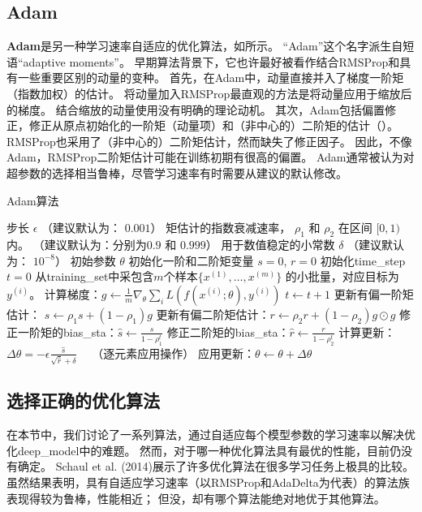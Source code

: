 \subsection{Adam}
\label{sec:adam}
\textbf{Adam}是另一种学习速率自适应的优化算法，如所示。
``Adam''这个名字派生自短语``adaptive moments''。
早期算法背景下，它也许最好被看作结合RMSProp和具有一些重要区别的动量的变种。
首先，在Adam中，动量直接并入了梯度一阶矩（指数加权）的估计。
将动量加入RMSProp最直观的方法是将动量应用于缩放后的梯度。
结合缩放的动量使用没有明确的理论动机。
其次，Adam包括偏置修正，修正从原点初始化的一阶矩（动量项）和（非中心的）二阶矩的估计（）。
RMSProp也采用了（非中心的）二阶矩估计，然而缺失了修正因子。
因此，不像Adam，RMSProp二阶矩估计可能在训练初期有很高的偏置。
Adam通常被认为对超参数的选择相当鲁棒，尽管学习速率有时需要从建议的默认修改。\par
\begin{algorithm}[ht]
	\caption{Adam算法}
	\label{alg:adam}
	\begin{algorithmic}
		\REQUIRE 步长 $\epsilon$ （建议默认为： $0.001$）
		\REQUIRE 矩估计的指数衰减速率， $\rho_1$ 和 $\rho_2$ 在区间 $[0, 1)$内。
		（建议默认为：分别为$0.9$ 和 $0.999$）
		\REQUIRE 用于数值稳定的小常数 $\delta$  （建议默认为： $10^{-8}$）
		\REQUIRE 初始参数 $\theta$
		\STATE 初始化一阶和二阶矩变量 $s = 0 $, $r = 0$
		\STATE 初始化\gls{time_step} $t=0$ 
		\STATE 从\gls{training_set}中采包含$m$个样本$\{ x^{(1)},\dots, x^{(m)}\}$ 的小批量，对应目标为$y^{(i)}$。
		\STATE 计算梯度：$g \leftarrow \frac{1}{m} \nabla_{\theta} \sum_i L(f(x^{(i)};\theta),y^{(i)})$ 
		\STATE $t \leftarrow t + 1$
		\STATE 更新有偏一阶矩估计： $s \leftarrow \rho_1 s + (1-\rho_1) g$
		\STATE 更新有偏二阶矩估计：$r \leftarrow \rho_2 r + (1-\rho_2)  g \odot g$
		\STATE 修正一阶矩的\gls{bias_sta}：$\hat{s} \leftarrow \frac{s}{1-\rho_1^t}$
		\STATE 修正二阶矩的\gls{bias_sta}：$\hat{r} \leftarrow \frac{r}{1-\rho_2^t}$
		\STATE 计算更新：$\Delta \theta = - \epsilon \frac{\hat{s}}{\sqrt{\hat{r}} + \delta}$ \ \  （逐元素应用操作）
		\STATE 应用更新：$\theta \leftarrow \theta + \Delta \theta$
		\ENDWHILE
	\end{algorithmic}
\end{algorithm}
\subsection{选择正确的优化算法}
\label{sec:choosing_the_right_optimization_algorithms}
在本节中，我们讨论了一系列算法，通过自适应每个模型参数的学习速率以解决优化\gls{deep_model}中的难题。
然而，对于哪一种优化算法具有最优的性能，目前仍没有确定。
Schaul et al. (2014)展示了许多优化算法在很多学习任务上极具的比较。
虽然结果表明，具有自适应学习速率（以RMSProp和AdaDelta为代表）的算法族表现得较为鲁棒，性能相近；
但没，却有哪个算法能绝对地优于其他算法。

